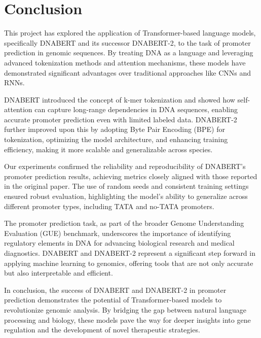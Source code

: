 \section{Conclusion}

This project has explored the application of Transformer-based language models, specifically DNABERT and its successor DNABERT-2, to the task of promoter prediction in genomic sequences. By treating DNA as a language and leveraging advanced tokenization methods and attention mechanisms, these models have demonstrated significant advantages over traditional approaches like CNNs and RNNs.

DNABERT introduced the concept of k-mer tokenization and showed how self-attention can capture long-range dependencies in DNA sequences, enabling accurate promoter prediction even with limited labeled data. DNABERT-2 further improved upon this by adopting Byte Pair Encoding (BPE) for tokenization, optimizing the model architecture, and enhancing training efficiency, making it more scalable and generalizable across species.

Our experiments confirmed the reliability and reproducibility of DNABERT's promoter prediction results, achieving metrics closely aligned with those reported in the original paper. The use of random seeds and consistent training settings ensured robust evaluation, highlighting the model's ability to generalize across different promoter types, including TATA and no-TATA promoters.

The promoter prediction task, as part of the broader Genome Understanding Evaluation (GUE) benchmark, underscores the importance of identifying regulatory elements in DNA for advancing biological research and medical diagnostics. DNABERT and DNABERT-2 represent a significant step forward in applying machine learning to genomics, offering tools that are not only accurate but also interpretable and efficient.

In conclusion, the success of DNABERT and DNABERT-2 in promoter prediction demonstrates the potential of Transformer-based models to revolutionize genomic analysis. By bridging the gap between natural language processing and biology, these models pave the way for deeper insights into gene regulation and the development of novel therapeutic strategies.
